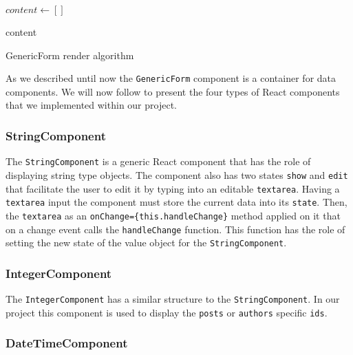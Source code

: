 \begin{algorithm}[H]
$content \leftarrow []$

\Return content
\label{algo1}
\caption{GenericForm render algorithm}
\end{algorithm}

As we described until now the \texttt{GenericForm} component is a container for data components. We will now follow to present the four types of React components that we implemented within our project.

\subsubsection{StringComponent}
\label{sub-sub-sec:string}

The \texttt{StringComponent} is a generic React component that has the role of displaying string type objects. The component also has two states \texttt{show} and \texttt{edit} that facilitate the user to edit it by typing into an editable \texttt{textarea}. Having a \texttt{textarea} input the component must store the current data into its \texttt{state}. Then, the \texttt{textarea} as an \texttt{onChange=\{this.handleChange\}} method applied on it that on a change event calls the \texttt{handleChange} function. This function has the role of setting the new state of the value object for the \texttt{StringComponent}.

\subsubsection{IntegerComponent}
\label{sub-sub-sec:integer}

The \texttt{IntegerComponent} has a similar structure to the \texttt{StringComponent}. In our project this component is used to display the \texttt{posts} or \texttt{authors} specific \texttt{ids}. 

\subsubsection{DateTimeComponent}
\label{sub-sub-sec:date}

